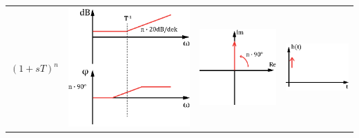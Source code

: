 \begin{tabular}{>{\centering\arraybackslash}p{1.5cm}|>{\centering\arraybackslash}p{2.5cm}|>{\centering\arraybackslash}p{2cm}|>{\centering\arraybackslash}p{2.5cm}}
\hline \rule[-2ex]{0pt}{5.5ex} $(1+sT)^n$ & \includegraphics[scale = 0.3]{images/bode_1stn.eps} & \includegraphics[scale = 0.4]{images/ort_1stn.eps}  & \includegraphics[scale = 0.5]{images/spr_1stn.eps} \\ 

\end{tabular}
